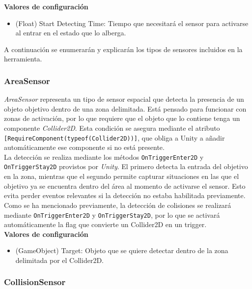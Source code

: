\textbf{Valores de configuración}
\begin{itemize}
	\item (Float) Start Detecting Time: Tiempo que necesitará el sensor para activarse al entrar en el estado que lo alberga.
\end{itemize}


A continuación se enumerarán y explicarán los tipos de sensores incluidos en la herramienta.\\
\subsubsection{AreaSensor}

\textit{AreaSensor} representa un tipo de sensor espacial que detecta la presencia de un objeto objetivo dentro de una zona delimitada. Está pensado para funcionar con zonas de activación, por lo que requiere que el objeto que lo contiene tenga un componente \textit{Collider2D}. Esta condición se asegura mediante el atributo \texttt{[RequireComponent(typeof(Collider2D))]}, que obliga a Unity a añadir automáticamente ese componente si no está presente.\\

La detección se realiza mediante los métodos \texttt{OnTriggerEnter2D} y \texttt{OnTriggerStay2D} provistos por \textit{Unity}. El primero detecta la entrada del objetivo en la zona, mientras que el segundo permite capturar situaciones en las que el objetivo ya se encuentra dentro del área al momento de activarse el sensor. Esto evita perder eventos relevantes si la detección no estaba habilitada previamente.\\

Como se ha mencionado previamente, la detección de colisiones se realizará mediante \texttt{OnTriggerEnter2D} y \texttt{OnTriggerStay2D}, por lo que se activará automáticamente la flag que convierte un Collider2D en un trigger.\\

\textbf{Valores de configuración}
\begin{itemize}
	\item (GameObject) Target: Objeto que se quiere detectar dentro de la zona delimitada por el Collider2D.
\end{itemize}

\subsubsection{CollisionSensor}

